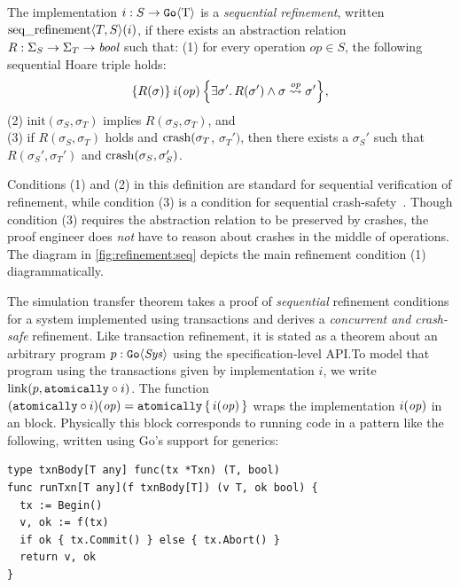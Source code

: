 \begin{definition}
  The implementation $i : S \to \mathtt{Go}\langle \mathrm{T} \rangle$ is a \emph{sequential
    refinement}, written \newline
  $\operatorname{seq\_refinement} \langle T, S \rangle(i)$, if there exists an abstraction relation
  $R : \Sigma_{S} \to \Sigma_{T} \to \textit{bool}$ such that: \newline
(1) for every operation
  $op \in S$, the following sequential Hoare triple holds:
  \[
    \hoare{R(\sigma)}{i(\opv)}{\exists \sigma'.\, R(\sigma') \land \sigma \overset{\opv}{\leadsto} \sigma'},
  \]
(2) $\mathrm{init}(\sigma_{S}, \sigma_{T})$ implies
$R(\sigma_{S}, \sigma_{T})$, and \\
(3) if $R(\sigma_{S}, \sigma_{T})$ holds and $\operatorname{crash}(\sigma_{T}$, $\sigma_{T}')$,
then there exists a $\sigma_{S}'$ such that $R(\sigma_{S}', \sigma_{T}')$ and
$\operatorname{crash}(\sigma_{S}, \sigma_{S}')$.%
  \label{def:seqrefinement}
\end{definition}
%
Conditions (1) and (2) in this definition are standard for sequential
verification of refinement, while condition (3) is a condition for sequential crash-safety~\citep{sigurbjarnarson:yggdrasil,chajed:argosy}. Though condition (3) requires the
abstraction relation to be preserved by crashes, the proof engineer does \emph{not} have to reason about crashes in the middle of operations.
The
diagram in \cref{fig:refinement:seq} depicts the main
refinement condition (1) diagrammatically.

The simulation transfer theorem takes a proof of \emph{sequential} refinement
conditions for a system implemented using transactions and derives a
\emph{concurrent and crash-safe} refinement. Like transaction refinement, it is
stated as a theorem about an arbitrary program $p : \mathtt{Go}\langle \mathit{Sys} \rangle$ using
the specification-level API.\@ To model that program using the transactions given
by implementation $i$, we write $\mathrm{link}(p, \mathtt{atomically}\circ i)$. The function
$(\mathtt{atomically}\circ i)(\mathit{op}) = \mathtt{atomically}\,\{\, i(\mathit{op}) \,\}$ wraps the implementation
$i(\mathit{op})$ in an  block. Physically this  block
corresponds to running code in a pattern like the following, written using Go's
support for generics:
%
\begin{verbatim}
type txnBody[T any] func(tx *Txn) (T, bool)
func runTxn[T any](f txnBody[T]) (v T, ok bool) {
  tx := Begin()
  v, ok := f(tx)
  if ok { tx.Commit() } else { tx.Abort() }
  return v, ok
}
\end{verbatim}

